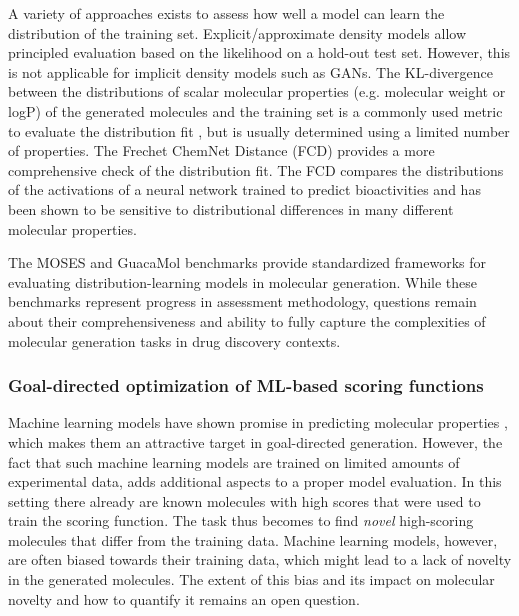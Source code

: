 A variety of approaches exists to assess how well a model can learn the distribution of the training
set. Explicit/approximate density models allow principled evaluation based on the likelihood on a
hold-out test set. However, this is not applicable for implicit density models such as GANs. The
KL-divergence between the distributions of scalar molecular properties (e.g. molecular weight or
logP) of the generated molecules and the training set is a commonly used metric to evaluate the
distribution fit \citep{brownGuacaMolBenchmarkingModels2019}, but is usually determined using a
limited number of properties. The Frechet ChemNet Distance (FCD)
\citep{preuerFrechetChemNetDistance2018} provides a more comprehensive check of the distribution
fit. The FCD compares the distributions of the activations of a neural network trained to predict
bioactivities and has been shown to be sensitive to distributional differences in many different
molecular properties.

The MOSES \citep{polykovskiyMolecularSetsMOSES2020} and GuacaMol
\citep{brownGuacaMolBenchmarkingModels2019} benchmarks provide standardized frameworks for
evaluating distribution-learning models in molecular generation. While these benchmarks represent
progress in assessment methodology, questions remain about their comprehensiveness and ability to
fully capture the complexities of molecular generation tasks in drug discovery contexts.

\subsubsection{Goal-directed optimization of ML-based scoring functions}
Machine learning models have shown promise in predicting molecular properties
\citep{mayrDeepToxToxicityPrediction2016,klambauerMachineLearningDrug2019,vamathevanApplicationsMachineLearning2019,chenRiseDeepLearning2018,stokesDeepLearningApproach2020},
which makes them an attractive target in goal-directed generation. However, the fact that such
machine learning models are trained on limited amounts of experimental data, adds additional aspects
to a proper model evaluation. In this setting there already are known molecules with high scores
that were used to train the scoring function. The task thus becomes to find \emph{novel}
high-scoring molecules that differ from the training data. Machine learning models, however, are
often biased towards their training data, which might lead to a lack of novelty in the generated
molecules. The extent of this bias and its impact on molecular novelty and how to quantify it
remains an open question.


